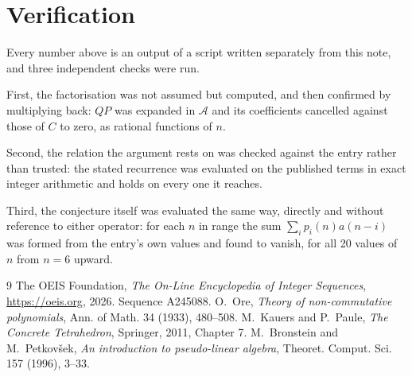 \documentclass[11pt,a4paper]{article}
\theoremstyle{plain}
\theoremstyle{definition}
\begin{document}
\section{Verification}

Every number above is an output of a script written separately from this note, and three
independent checks were run.

First, the factorisation was not assumed but computed, and then confirmed by multiplying
back: $QP$ was expanded in $\mathcal{A}$ and its coefficients cancelled against those of
$C$ to zero, as rational functions of $n$.

Second, the relation the argument rests on was checked against the entry rather than
trusted: the stated recurrence was evaluated on the published terms in exact integer
arithmetic and holds on every one it reaches.

Third, the conjecture itself was evaluated the same way, directly and without reference to
either operator: for each $n$ in range the sum $\sum_{i}p_{i}(n)a(n-i)$ was formed from the
entry's own values and found to vanish, for all 20 values of $n$ from
$n=6$ upward.

\begin{thebibliography}{9}
 The OEIS Foundation, \emph{The On-Line Encyclopedia of Integer Sequences},
\url{https://oeis.org}, 2026. Sequence A245088.
 O.~Ore, \emph{Theory of non-commutative polynomials}, Ann. of Math. 34
(1933), 480--508.
 M.~Kauers and P.~Paule, \emph{The Concrete Tetrahedron}, Springer, 2011,
Chapter 7.
 M.~Bronstein and M.~Petkov\v{s}ek, \emph{An introduction to
pseudo-linear algebra}, Theoret. Comput. Sci. 157 (1996), 3--33.
\end{thebibliography}
\end{document}
